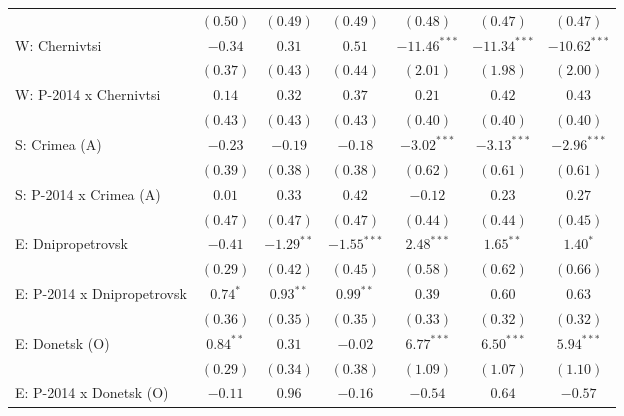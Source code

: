 \begin{table}
\begin{center}
\begin{small}
\begin{tabular}{l c c c c c c}
                            & $(0.50)$      & $(0.49)$       & $(0.49)$       & $(0.48)$       & $(0.47)$       & $(0.47)$       \\
W: Chernivtsi               & $-0.34$       & $0.31$         & $0.51$         & $-11.46^{***}$ & $-11.34^{***}$ & $-10.62^{***}$ \\
                            & $(0.37)$      & $(0.43)$       & $(0.44)$       & $(2.01)$       & $(1.98)$       & $(2.00)$       \\
W: P-2014 x Chernivtsi      & $0.14$        & $0.32$         & $0.37$         & $0.21$         & $0.42$         & $0.43$         \\
                            & $(0.43)$      & $(0.43)$       & $(0.43)$       & $(0.40)$       & $(0.40)$       & $(0.40)$       \\
S: Crimea (A)               & $-0.23$       & $-0.19$        & $-0.18$        & $-3.02^{***}$  & $-3.13^{***}$  & $-2.96^{***}$  \\
                            & $(0.39)$      & $(0.38)$       & $(0.38)$       & $(0.62)$       & $(0.61)$       & $(0.61)$       \\
S: P-2014 x Crimea (A)      & $0.01$        & $0.33$         & $0.42$         & $-0.12$        & $0.23$         & $0.27$         \\
                            & $(0.47)$      & $(0.47)$       & $(0.47)$       & $(0.44)$       & $(0.44)$       & $(0.45)$       \\
E: Dnipropetrovsk           & $-0.41$       & $-1.29^{**}$   & $-1.55^{***}$  & $2.48^{***}$   & $1.65^{**}$    & $1.40^{*}$     \\
                            & $(0.29)$      & $(0.42)$       & $(0.45)$       & $(0.58)$       & $(0.62)$       & $(0.66)$       \\
E: P-2014 x Dnipropetrovsk  & $0.74^{*}$    & $0.93^{**}$    & $0.99^{**}$    & $0.39$         & $0.60$         & $0.63$         \\
                            & $(0.36)$      & $(0.35)$       & $(0.35)$       & $(0.33)$       & $(0.32)$       & $(0.32)$       \\
E: Donetsk (O)              & $0.84^{**}$   & $0.31$         & $-0.02$        & $6.77^{***}$   & $6.50^{***}$   & $5.94^{***}$   \\
                            & $(0.29)$      & $(0.34)$       & $(0.38)$       & $(1.09)$       & $(1.07)$       & $(1.10)$       \\
E: P-2014 x Donetsk (O)     & $-0.11$       & $0.96$         & $-0.16$        & $-0.54$        & $0.64$         & $-0.57$        \\

\end{tabular}
\end{small}
\end{center}
\end{table}

